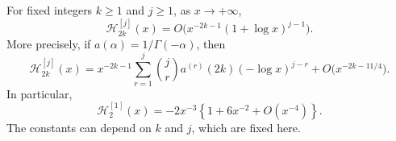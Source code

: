 \begin{samepage}
\begin{lemma}\label{jct:lem:kernel-wing}
For fixed integers $k\ge1$ and $j\ge1$, as $x\to+\infty$,
\begin{equation}\label{jct:wing:derivative-bound}
 \mathcal H_{2k}^{[j]}(x)
 =O\bigl(x^{-2k-1}(1+\log x)^{j-1}\bigr).
\end{equation}
More precisely, if $a(\alpha)=1/\Gamma(-\alpha)$, then
\begin{equation}\label{jct:wing:leading-polynomial}
 \mathcal H_{2k}^{[j]}(x)
 =x^{-2k-1}\sum_{r=1}^j\binom jr
        a^{(r)}(2k)(-\log x)^{j-r}
       +O\bigl(x^{-2k-11/4}\bigr).
\end{equation}
In particular,
\begin{equation}\label{jct:wing:first-kernel-tail}
 \mathcal H_2^{[1]}(x)
 =-2x^{-3}\left\{1+6x^{-2}+O(x^{-4})\right\}.
\end{equation}
The constants can depend on $k$ and $j$, which are fixed here.
\end{lemma}
\end{samepage}


